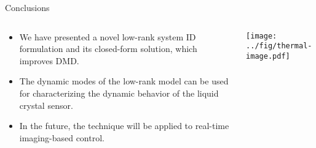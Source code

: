 \documentclass[10pt]{beamer}
\newcommand{\blue}{\color{blue}}
\begin{document}
\begin{frame}{Conclusions}
  \begin{columns}
    \begin{column}{0.6\textwidth}
      \begin{itemize}
      \item We have presented a novel {\blue low-rank system ID} formulation and its closed-form solution, which improves DMD.
        \vspace{0.3in}
      \item The dynamic modes of the low-rank model can be used for characterizing the dynamic behavior of the liquid crystal sensor.
        \vspace{0.3in}
      \item In the future, the technique will be applied to real-time imaging-based control.
      \end{itemize}
    \end{column}
    \begin{column}{0.4\textwidth}
      \texttt{[image: ../fig/thermal-image.pdf]}
    \end{column}
  \end{columns}
\end{frame}
\begin{frame}
  \titlepage
\end{frame}
\end{document}
